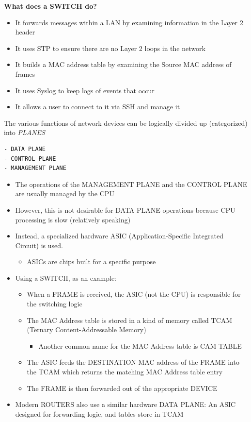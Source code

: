 \textbf{What does a SWITCH do?}

\begin{itemize}
\tightlist
\item
  It forwards messages within a LAN by examining information in the
  Layer 2 header
\item
  It uses STP to ensure there are no Layer 2 loops in the network
\item
  It builds a MAC address table by examining the Source MAC address of
  frames
\item
  It uses Syslog to keep logs of events that occur
\item
  It allows a user to connect to it via SSH and manage it
\end{itemize}

The various functions of network devices can be logically divided up
(categorized) into \emph{PLANES}

\begin{lstlisting}
- DATA PLANE
- CONTROL PLANE
- MANAGEMENT PLANE
\end{lstlisting}

\begin{itemize}
\tightlist
\item
  The operations of the MANAGEMENT PLANE and the CONTROL PLANE are
  usually managed by the CPU
\item
  However, this is not desirable for DATA PLANE operations because CPU
  processing is slow (relatively speaking)
\item
  Instead, a specialized hardware ASIC (Application-Specific Integrated
  Circuit) is used.

  \begin{itemize}
  \tightlist
  \item
    ASICs are chips built for a specific purpose
  \end{itemize}
\item
  Using a SWITCH, as an example:

  \begin{itemize}
  \tightlist
  \item
    When a FRAME is received, the ASIC (not the CPU) is responsible for
    the switching logic
  \item
    The MAC Address table is stored in a kind of memory called TCAM
    (Ternary Content-Addressable Memory)

    \begin{itemize}
    \tightlist
    \item
      Another common name for the MAC Address table is CAM TABLE
    \end{itemize}
  \item
    The ASIC feeds the DESTINATION MAC address of the FRAME into the
    TCAM which returns the matching MAC Address table entry
  \item
    The FRAME is then forwarded out of the appropriate DEVICE
  \end{itemize}
\item
  Modern ROUTERS also use a similar hardware DATA PLANE: An ASIC
  designed for forwarding logic, and tables store in TCAM
\end{itemize}

